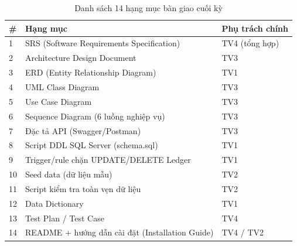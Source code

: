 \begin{table}[htbp]
    \centering
    \small
    \caption{Danh sách 14 hạng mục bàn giao cuối kỳ}
    \begin{tabular}{|p{0.6cm}|p{7.5cm}|p{3.5cm}|}
        \hline
        \textbf{\#} & \textbf{Hạng mục} & \textbf{Phụ trách chính} \\
        \hline
        1 & SRS (Software Requirements Specification) & TV4 (tổng hợp) \\
        \hline
        2 & Architecture Design Document & TV3 \\
        \hline
        3 & ERD (Entity Relationship Diagram) & TV1 \\
        \hline
        4 & UML Class Diagram & TV3 \\
        \hline
        5 & Use Case Diagram & TV3 \\
        \hline
        6 & Sequence Diagram (6 luồng nghiệp vụ) & TV3 \\
        \hline
        7 & Đặc tả API (Swagger/Postman) & TV3 \\
        \hline
        8 & Script DDL SQL Server (schema.sql) & TV1 \\
        \hline
        9 & Trigger/rule chặn UPDATE/DELETE Ledger & TV1 \\
        \hline
        10 & Seed data (dữ liệu mẫu) & TV2 \\
        \hline
        11 & Script kiểm tra toàn vẹn dữ liệu & TV2 \\
        \hline
        12 & Data Dictionary & TV1 \\
        \hline
        13 & Test Plan / Test Case & TV4 \\
        \hline
        14 & README + hướng dẫn cài đặt (Installation Guide) & TV4 / TV2 \\
        \hline
    \end{tabular}
\end{table}
